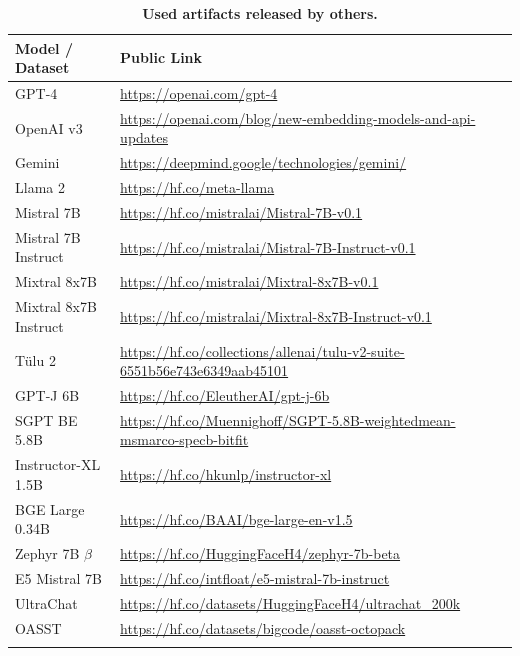 \documentclass{article}
\newcommand{\tulu}{T\"ulu}
\newcommand{\llama}{Llama}
\begin{document}
\begin{longtable}{p{3.9cm} p{9.2cm}}
\caption{\textbf{Used artifacts released by others.}} \\
\toprule
Model / Dataset & Public Link \\
\midrule
GPT-4 \citep{openai2023gpt4} & \scriptsize{\url{https://openai.com/gpt-4}} \\
OpenAI v3 \citep{openai2023gpt4} & \scriptsize{\url{https://openai.com/blog/new-embedding-models-and-api-updates}} \\    
Gemini \cite{geminiteam2023gemini} & \scriptsize{\url{https://deepmind.google/technologies/gemini/}} \\
\midrule
\llama{} 2 \citep{touvron2023llama} & \scriptsize{\url{https://hf.co/meta-llama}} \\
Mistral 7B \cite{jiang2023mistral} & \scriptsize{\url{https://hf.co/mistralai/Mistral-7B-v0.1}} \\
Mistral 7B Instruct \cite{jiang2023mistral} & \scriptsize{\url{https://hf.co/mistralai/Mistral-7B-Instruct-v0.1}} \\
Mixtral 8x7B \cite{jiang2024mixtral} & \scriptsize{\url{https://hf.co/mistralai/Mixtral-8x7B-v0.1}} \\
Mixtral 8x7B Instruct \cite{jiang2024mixtral} & \scriptsize{\url{https://hf.co/mistralai/Mixtral-8x7B-Instruct-v0.1}} \\
\tulu{} 2 \citep{ivison2023camels} & \scriptsize{\url{https://hf.co/collections/allenai/tulu-v2-suite-6551b56e743e6349aab45101}} \\
GPT-J 6B \citep{wang2021gpt} & \scriptsize{\url{https://hf.co/EleutherAI/gpt-j-6b}} \\
SGPT BE 5.8B \cite{muennighoff2022sgpt} & \scriptsize{\url{https://hf.co/Muennighoff/SGPT-5.8B-weightedmean-msmarco-specb-bitfit}} \\
Instructor-XL 1.5B \cite{su2023embedder} & \scriptsize{\url{https://hf.co/hkunlp/instructor-xl}} \\
BGE Large 0.34B \cite{xiao2023cpack} & \scriptsize{\url{https://hf.co/BAAI/bge-large-en-v1.5}} \\
Zephyr 7B $\beta$ \cite{tunstall2023zephyr} & \scriptsize{\url{https://hf.co/HuggingFaceH4/zephyr-7b-beta}} \\
E5 Mistral 7B \cite{wang2024improving} & \scriptsize{\url{https://hf.co/intfloat/e5-mistral-7b-instruct}} \\
UltraChat \cite{ding2023enhancing,tunstall2023zephyr} & \scriptsize{\url{https://hf.co/datasets/HuggingFaceH4/ultrachat_200k}} \\
OASST \cite{köpf2023openassistant,muennighoff2023octopack} & \scriptsize{\url{https://hf.co/datasets/bigcode/oasst-octopack}} \\
\bottomrule
\label{tab:usedartifacts}
\end{longtable}
\end{document}
